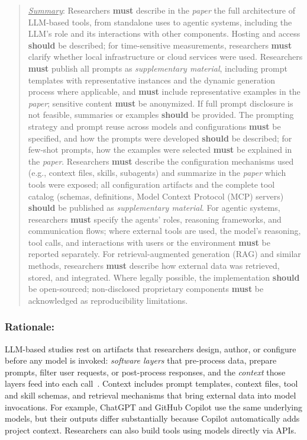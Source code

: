 \documentclass[smallextended]{svjour3}
\newcommand{\must}{\textbf{must}\xspace}
\newcommand{\should}{\textbf{should}\xspace}
\newcommand{\summary}{\underline{\emph{Summary}}\xspace}
\newcommand{\summary}{\textbf{\emph{Summary}}\xspace}
\newcommand{\paper}{\emph{paper}\xspace}
\newcommand{\supplementarymaterial}{\emph{supplementary material}\xspace}
\newcommand{\paper}{\emph{paper}\xspace}
\newcommand{\supplementarymaterial}{\emph{supplementary material}\xspace}
\newenvironment{framed}{\begin{quote}}{\end{quote}}
\newcommand{\guidelinesubsubsection}[1]{\subsubsection{\bfseries #1:}}
\newcommand{\guidelinesubsubsection}[1]{\subsubsection{#1}}
\begin{document}
\vspace{0.5\baselineskip}
\begin{framed}
\summary: %
Researchers \must describe in the \paper the full architecture of LLM-based tools, from standalone uses to agentic systems, including the LLM's role and its interactions with other components. Hosting and access \should be described; for time-sensitive measurements, researchers \must clarify whether local infrastructure or cloud services were used. Researchers \must publish all prompts as \supplementarymaterial, including prompt templates with representative instances and the dynamic generation process where applicable, and \must include representative examples in the \paper; sensitive content \must be anonymized. If full prompt disclosure is not feasible, summaries or examples \should be provided. The prompting strategy and prompt reuse across models and configurations \must be specified, and how the prompts were developed \should be described; for few-shot prompts, how the examples were selected \must be explained in the \paper. Researchers \must describe the configuration mechanisms used (e.g., context files, skills, subagents) and summarize in the \paper which tools were exposed; all configuration artifacts and the complete tool catalog (schemas, definitions, Model Context Protocol (MCP) servers) \should be published as \supplementarymaterial. For agentic systems, researchers \must specify the agents' roles, reasoning frameworks, and communication flows; where external tools are used, the model's reasoning, tool calls, and interactions with users or the environment \must be reported separately. For retrieval-augmented generation (RAG) and similar methods, researchers \must describe how external data was retrieved, stored, and integrated. Where legally possible, the implementation \should be open-sourced; non-disclosed proprietary components \must be acknowledged as reproducibility limitations.
\end{framed}

\guidelinesubsubsection{Rationale}

LLM-based studies rest on artifacts that researchers design, author, or configure before any model is invoked: \emph{software layers} that pre-process data, prepare prompts, filter user requests, or post-process responses, and the \emph{context} those layers feed into each call~\cite{galster2026configuring}. Context includes prompt templates, context files, tool and skill schemas, and retrieval mechanisms that bring external data into model invocations.
For example, ChatGPT and GitHub Copilot use the same underlying models, but their outputs differ substantially because Copilot automatically adds project context. Researchers can also build tools using models directly via APIs.
\end{document}
